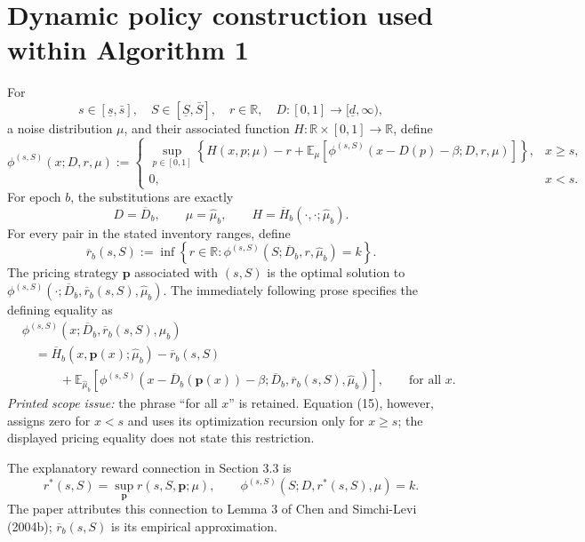 \documentclass[11pt]{article}
\begin{document}
\section*{Dynamic policy construction used within Algorithm 1}
For
\[
s\in[\underline s,\bar s],\quad
S\in[\underline S,\bar S],\quad r\in\mathbb R,
\quad D:[0,1]\longrightarrow[\underline d,\infty),
\]
a noise distribution \(\mu\), and their associated function
\(H:\mathbb R\times[0,1]\longrightarrow\mathbb R\), define
\begin{equation}
\phi^{(s,S)}(x;D,r,\mu):=
\begin{cases}
\displaystyle\sup_{p\in[0,1]}
\left\{H(x,p;\mu)-r+
\mathbb E_\mu\!\left[
\phi^{(s,S)}(x-D(p)-\beta;D,r,\mu)
\right]\right\},&x\geq s,\\
0,&x<s.
\end{cases}
\tag{15}
\end{equation}
For epoch \(b\), the substitutions are exactly
\[
D=\overline D_b,\qquad
\mu=\widehat\mu_b,\qquad
H=\overline H_b(\cdot,\cdot;\widehat\mu_b).
\]
For every pair in the stated inventory ranges, define
\begin{equation}
\overline r_b(s,S):=
\inf\left\{r\in\mathbb R:
\phi^{(s,S)}(S;\overline D_b,r,\widehat\mu_b)=k\right\}.
\tag{16}
\end{equation}
The pricing strategy \(\boldsymbol p\) associated with \((s,S)\) is the optimal solution to
\(\phi^{(s,S)}(\cdot;\overline D_b,\overline r_b(s,S),\widehat\mu_b)\).
The immediately following prose specifies the defining equality as
\[
\begin{aligned}
&\phi^{(s,S)}(x;\overline D_b,\overline r_b(s,S),\widehat\mu_b)\\
&\quad=\overline H_b(x,\boldsymbol p(x);\widehat\mu_b)
-\overline r_b(s,S)\\
&\qquad\quad+
\mathbb E_{\widehat\mu_b}\!\left[
\phi^{(s,S)}\!\left(x-\overline D_b(\boldsymbol p(x))-\beta;
\overline D_b,\overline r_b(s,S),\widehat\mu_b\right)
\right],\qquad\text{for all }x.
\end{aligned}
\]
\emph{Printed scope issue:} the phrase ``for all \(x\)'' is retained. Equation (15), however, assigns zero for \(x<s\) and uses its optimization recursion only for \(x\geq s\); the displayed pricing equality does not state this restriction.

The explanatory reward connection in Section 3.3 is
\[
r^*(s,S)=\sup_{\boldsymbol p}r(s,S,\boldsymbol p;\mu),
\qquad
\phi^{(s,S)}(S;D,r^*(s,S),\mu)=k.
\]
The paper attributes this connection to Lemma 3 of Chen and Simchi-Levi (2004b); \(\overline r_b(s,S)\) is its empirical approximation.
\end{document}
